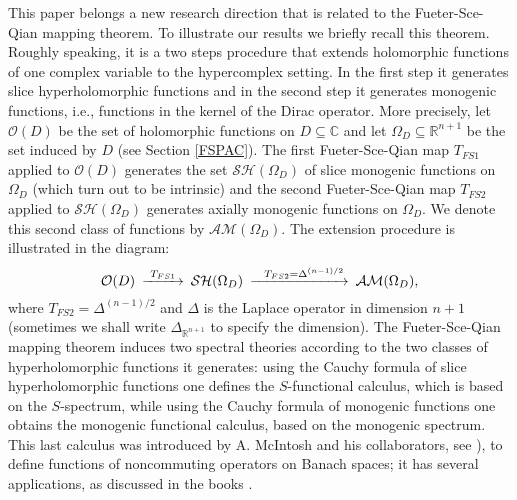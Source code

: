 \documentclass[reqno,11pt]{amsart}
\numberwithin{equation}{section}
\theoremstyle{definition}
\begin{document}
\medskip
This paper belongs a new research direction that is related to
the Fueter-Sce-Qian mapping theorem.
To illustrate our results we briefly recall this theorem.
Roughly speaking, it is a two steps procedure that extends
holomorphic functions of one complex variable to the hypercomplex setting.
In the first step it generates slice hyperholomorphic functions
and in the second step it generates monogenic functions, i.e., functions in the kernel of the Dirac operator.
More precisely,
let $\mathcal{O}(D)$ be the set of holomorphic functions
on $D\subseteq \mathbb{C}$ and let $\Omega_D\subseteq \mathbb{R}^{n+1}$ be the set induced by $D$ (see Section \ref{FSPAC}).
The first  Fueter-Sce-Qian map $T_{FS1}$ applied to $\mathcal{O}(D)$ generates the set ${\mathcal{SH}(\Omega_D)}$ of slice monogenic functions on $\Omega_D$
(which turn out to be intrinsic) and
the second  Fueter-Sce-Qian map $T_{FS2}$ applied to ${\mathcal{SH}(\Omega_D)}$ generates
 axially monogenic functions on $\Omega_D$. We denote this second class of functions
by $\mathcal{AM}(\Omega_D)$.
The extension procedure is illustrated in the diagram:
\begin{equation*}
\begin{CD}
\textcolor{black}{\mathcal{O}(D)}  @>T_{FS1}>> \textcolor{black}{\mathcal{SH}(\Omega_D)}  @>\ \   T_{FS2}=\Delta^{(n-1)/2} >>\textcolor{black}{\mathcal{AM}(\Omega_D)},
\end{CD}
\end{equation*}
where $T_{FS2}=\Delta^{(n-1)/2} $ and $\Delta$ is the Laplace operator in dimension $n+1$ (sometimes we shall write $\Delta_{\mathbb{R}^{n+1}}$ to specify the dimension).
The Fueter-Sce-Qian mapping theorem induces two spectral theories according to the two classes
of hyperholomorphic functions it generates: using the Cauchy formula of slice hyperholomorphic functions one defines the $S$-functional calculus, which is based on the $S$-spectrum, while using the Cauchy formula of monogenic functions one obtains the monogenic functional calculus, based on the monogenic spectrum.
This last calculus was introduced by  A. McIntosh and his collaborators,
see \cite{JM}), to define functions of
noncommuting operators on Banach spaces; it has several applications,
as discussed in the books \cite{J,TAOBOOK}.
\end{document}
